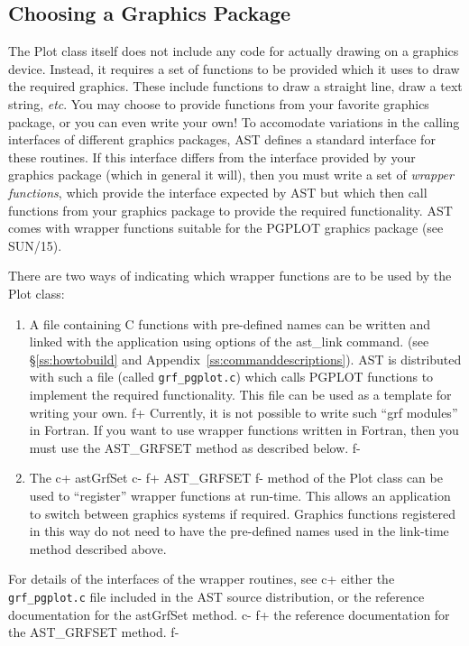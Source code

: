 \documentclass[twoside,11pt]{article}
\newcommand{\xref}[3]{#1}
\newcommand{\appref}[1]{Appendix~\ref{#1}}
\newcommand{\secref}[1]{\S\ref{#1}}
\newcommand{\appref}[1]{\ref{#1}}
\newcommand{\secref}[1]{\ref{#1}}
\begin{document}
\subsection{\label{ss:choosingagraphicspackage}Choosing a Graphics Package}
The Plot class itself does not include any code for actually drawing on a
graphics device. Instead, it requires a set of functions to be provided
which it uses to draw the required graphics. These include functions
to draw a straight line, draw a text string, \emph{etc}. You may choose
to provide functions from your favorite graphics package, or you can even
write your own! To accomodate variations in the calling interfaces of
different graphics packages, AST defines a standard interface for these
routines. If this interface differs from the interface provided by your
graphics package (which in general it will), then you must write a set of
\emph{wrapper functions}, which provide the interface expected by AST but
which then call functions from your graphics package to provide the
required functionality. AST comes with wrapper functions suitable for
the PGPLOT graphics package (see \xref{SUN/15}{sun15}{}).

There are two ways of indicating which wrapper functions are to be used by
the Plot class:
\begin{enumerate}

\item A file containing C functions with pre-defined names can be written
and linked with the application using options of the ast\_link command.
(see \secref{ss:howtobuild} and \appref{ss:commanddescriptions}). AST is
distributed with such a file (called {\tt grf\_pgplot.c}) which calls PGPLOT
functions to implement the required functionality. This file can be used
as a template for writing your own.
f+
Currently, it is not possible to write such ``grf modules'' in Fortran.
If you want to use wrapper functions written in Fortran, then you must
use the AST\_GRFSET method as described below.
f-

\item The
c+
astGrfSet
c-
f+
AST\_GRFSET
f-
method of the Plot class can be used to ``register''
wrapper functions at run-time. This allows an application to switch
between graphics systems if required. Graphics functions registered in
this way do not need to have the pre-defined names used in the link-time
method described above.

\end{enumerate}

For details of the interfaces of the wrapper routines, see
c+
either the {\tt grf\_pgplot.c} file included in the AST source
distribution, or the reference documentation for the astGrfSet method.
c-
f+
the reference documentation for the AST\_GRFSET method.
f-
\end{document}
